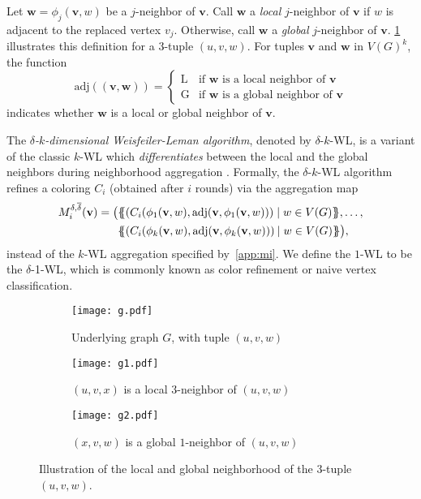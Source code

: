 \documentclass{article}
\theoremstyle{definition}
\newcommand{\new}[1]{\emph{#1}}
\newcommand{\ndelta}{\ensuremath{\overline{\delta}}}
\renewcommand{\vec}[1]{\mathbf{#1}}
\newcommand{\kwl}{$k$-\textsf{WL}\xspace}
\newcommand{\deltakwl}{$\delta$-$k$-\textsf{WL}\xspace}
\begin{document}
Let $\vec{w} = \phi_j(\vec{v},w)$ be a $j$-{neighbor} of $\vec{v}$. Call $\vec{w}$ a \new{local} $j$-neighbor of $\vec{v}$ if $w$ is adjacent to the replaced vertex $v_j$. Otherwise, call $\vec{w}$ a \new{global} $j$-neighbor of $\vec{v}$. \cref{kwlill} illustrates this definition for a 3-tuple $(u,v,w)$.
For tuples $\vec{v}$ and $\vec{w}$ in $V(G)^k$, the function
\begin{equation*}
\textrm{adj}((\vec{v},\vec{w})) =
\begin{cases} 
\text{L} & \text{if $\vec{w}$ is a local neighbor of $\vec{v}$} \\ 
\text{G} & \text{if $\vec{w}$ is a global neighbor of $\vec{v}$}
\end{cases} 
\end{equation*}
indicates whether $\vec{w}$ is a local or global neighbor of $\vec{v}$. 

The \new{$\delta$-$k$-dimensional Weisfeiler-Leman algorithm}, denoted by \deltakwl, is a variant of the classic \kwl which \emph{differentiates} between the local and the global neighbors during neighborhood aggregation \cite{Mal2014}. Formally, the \deltakwl algorithm refines a coloring $C_i$ (obtained after $i$ rounds) via the aggregation map 
\begin{equation}\label{app:mid}
\begin{split}
M^{\delta,\ndelta}_i(\vec{v}) =   \big( &\{\!\! \{  (C_i({\phi_1(\vec{v},w)}, \textrm{adj}(\vec{v}, \phi_1(\vec{v},w)     )) \mid w \in V(G) \} \!\!\}, \dots, \\ &\{\!\! \{  (C_i({\phi_k(\vec{v},w)}, \textrm{adj}(\vec{v},  \phi_k(\vec{v},w)    )) \hspace{-0.5pt}\mid w \in V(G) \}  \!\!\} \big),
\end{split}	
\end{equation}
instead of the \kwl aggregation specified by~\cref{app:mi}. We define the $1$-\textsf{WL} to be the $\delta$-1-\textsf{WL}, which is commonly known as color refinement or naive vertex classification.
\begin{figure}[t]
	\begin{center}
		\begin{subfigure}[c]{0.28\textwidth}
			\centering
			\texttt{[image: g.pdf]}
			\caption{Underlying graph $G$, with tuple $(u,v,w)$}
		\end{subfigure}\hspace{10pt}
		\begin{subfigure}[c]{0.28\textwidth}
			\centering
			\texttt{[image: g1.pdf]}
			\caption{$(u,v,x)$ is a local $3$-neighbor of $(u,v,w)$  }
		\end{subfigure}\hspace{10pt}
		\begin{subfigure}[c]{0.28\textwidth}
			\centering
			\texttt{[image: g2.pdf]}
			\caption{$(x,v,w)$ is a global $1$-neighbor of $(u,v,w)$}
		\end{subfigure}
	\end{center}
	\caption{Illustration of the local and global neighborhood of the $3$-tuple $(u,v,w)$.}\label{kwlill}
\end{figure}
\end{document}
